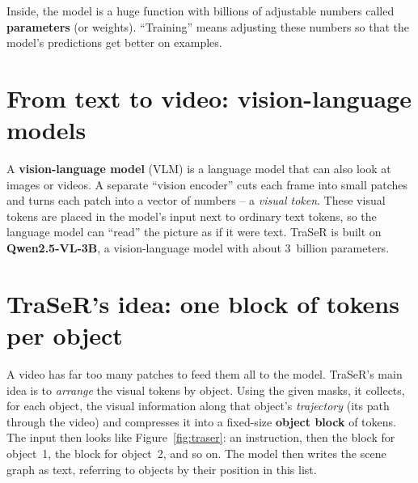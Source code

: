 \documentclass[11pt,openany]{book}
\begin{document}
Inside, the model is a huge function with billions of adjustable numbers called \textbf{parameters} (or weights). ``Training''
means adjusting these numbers so that the model's predictions get better on examples.

\section{From text to video: vision-language models}
A \textbf{vision-language model} (VLM) is a language model that can also look at images or videos. A separate ``vision encoder''
cuts each frame into small patches and turns each patch into a vector of numbers -- a \emph{visual token}. These visual tokens are
placed in the model's input next to ordinary text tokens, so the language model can ``read'' the picture as if it were text.
TraSeR is built on \textbf{Qwen2.5-VL-3B}, a vision-language model with about 3~billion parameters.

\section{TraSeR's idea: one block of tokens per object}
A video has far too many patches to feed them all to the model. TraSeR's main idea is to \emph{arrange} the visual tokens by
object. Using the given masks, it collects, for each object, the visual information along that object's \emph{trajectory}
(its path through the video) and compresses it into a fixed-size \textbf{object block} of tokens. The input then looks like
Figure~\ref{fig:traser}: an instruction, then the block for object~1, the block for object~2, and so on. The model then writes the
scene graph as text, referring to objects by their position in this list.
\end{document}
